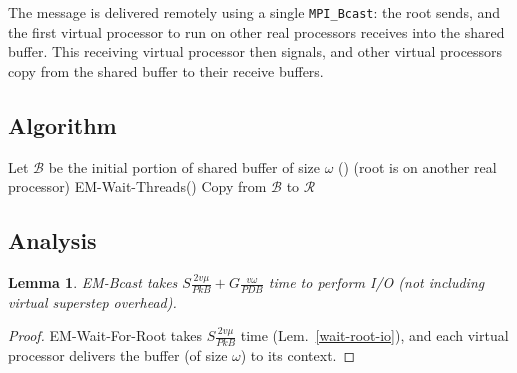 \documentclass[12pt]{carletoncsthesis}
\newtheorem{lemma}[thm]{Lemma}
\begin{document}
The message is delivered remotely using a single {\tt MPI\_Bcast}: the root
sends, and the first virtual processor to run on other real processors
receives into the shared buffer.  This receiving virtual processor then
signals, and other virtual processors copy from the shared buffer to their
receive buffers.

\clearpage
\subsection{Algorithm}


\begin{algorithm}
\BlankLine
Let $\mathcal{B}$ be the initial portion of shared buffer of size $\omega$
\BlankLine
{}
	\Else(){
		\Else(root is on another real processor){
			{\sc EM-Wait-Threads()}\;
			Copy from $\mathcal{B}$ to $\mathcal{R}$
		}
	}
\BlankLine{}\BlankLine
\caption{{\sc EM-Bcast}}
\label{bcast-alg}
\end{algorithm}


\clearpage
\subsection{Analysis}


\begin{lemma}
\label{em-bcast-io}
{\sc EM-Bcast} takes $S\frac{2v\mu}{PkB} + G\frac{v\omega}{PDB}$ time to
perform I/O (not including virtual superstep overhead).
\end{lemma}
\begin{proof}
{\sc EM-Wait-For-Root} takes $S\frac{2v\mu}{PkB}$ time
(Lem.~\ref{wait-root-io}), and each virtual processor delivers the buffer (of
size $\omega$) to its context.
\end{proof}

$ $ \\
\end{document}
